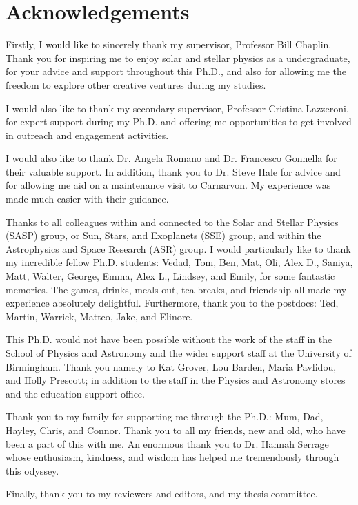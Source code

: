 \chapter*{Acknowledgements}
\thispagestyle{plain}

Firstly, I would like to sincerely thank my supervisor, Professor Bill Chaplin. Thank you for inspiring me to enjoy solar and stellar physics as a undergraduate, for your advice and support throughout this Ph.D., and also for allowing me the freedom to explore other creative ventures during my studies.

I would also like to thank my secondary supervisor, Professor Cristina Lazzeroni, for expert support during my Ph.D. and offering me opportunities to get involved in outreach and engagement activities.

I would also like to thank Dr. Angela Romano and Dr. Francesco Gonnella for their valuable support. In addition, thank you to Dr. Steve Hale for advice and for allowing me aid on a maintenance visit to Carnarvon. My experience was made much easier with their guidance.

Thanks to all colleagues within and connected to the Solar and Stellar Physics (SASP) group, or Sun, Stars, and Exoplanets (SSE) group, and within the Astrophysics and Space Research (ASR) group. I would particularly like to thank my incredible fellow Ph.D. students: Vedad, Tom, Ben, Mat, Oli, Alex D., Saniya, Matt, Walter, George, Emma, Alex L., Lindsey, and Emily, for some fantastic memories. The games, drinks, meals out, tea breaks, and friendship all made my experience absolutely delightful. Furthermore, thank you to the postdocs: Ted, Martin, Warrick, Matteo, Jake, and Elinore.

This Ph.D. would not have been possible without the work of the staff in the School of Physics and Astronomy and the wider support staff at the University of Birmingham. Thank you namely to Kat Grover, Lou Barden, Maria Pavlidou, and Holly Prescott; in addition to the staff in the Physics and Astronomy stores and the education support office.

Thank you to my family for supporting me through the Ph.D.: Mum, Dad, Hayley, Chris, and Connor. Thank you to all my friends, new and old, who have been a part of this with me. An enormous thank you to Dr. Hannah Serrage whose enthusiasm, kindness, and wisdom has helped me tremendously through this odyssey.

Finally, thank you to my reviewers and editors, and my thesis committee.